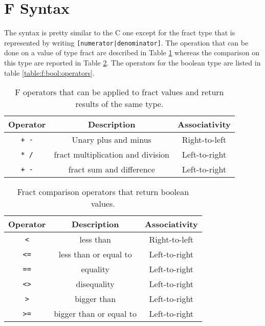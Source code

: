 \section{F Syntax}
The syntax is pretty similar to the C one except for the fract type that
is represented by writing \verb![numerator|denominator]!.
The operation that can be done on a value of type fract are described in Table
\ref{table:f:fract:operators} whereas the comparison on this type are reported
in Table \ref{table:f:fract:comparison:operators}.
The operators for the boolean type are listed in table 
\ref{table:f:bool:operators}.





\begin{table}[h]
\centering
\begin{tabular}{|c|c|c|}
\hline
\textbf{Operator} & \textbf{Description} & \textbf{Associativity} \\ 
\hline
\verb|+ -| & Unary plus and minus 	& Right-to-left	\\
\verb|* /| & fract multiplication and division & Left-to-right \\ 
\verb|+ -| & fract sum and difference & Left-to-right \\
\hline
\end{tabular}
\caption{F operators that can be applied to fract values and return results
of the same type.}
\label{table:f:fract:operators}


\end{table}

\begin{table}[h]
\centering
\begin{tabular}{|c|c|c|}
\hline
\textbf{Operator} & \textbf{Description} & \textbf{Associativity} \\ 
\hline
\verb|<|	& less than	& Right-to-left	\\
\verb|<=|	& less than or equal to	& Left-to-right \\ 
\verb|==|	& equality & Left-to-right \\
\verb|<>|	& disequality & Left-to-right \\
\verb|>|	& bigger than & Left-to-right\\
\verb|>=|	& bigger than or equal to & Left-to-right \\
\hline
\end{tabular}
\caption{Fract comparison operators that return boolean values.}
\label{table:f:fract:comparison:operators}
\end{table}


